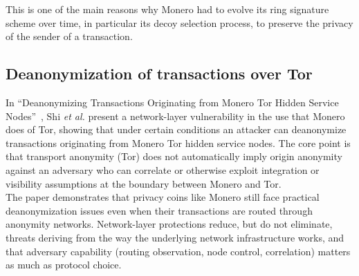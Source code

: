 \documentclass[conference]{IEEEtran}
\begin{document}
This is one of the main reasons why Monero had to evolve its ring signature scheme over time, in particular its decoy selection process, to preserve the privacy of the sender of a transaction.

\subsection{Deanonymization of transactions over Tor}
In ``Deanonymizing Transactions Originating from Monero Tor Hidden Service Nodes''~\cite{monero_tor_deanonymization}, Shi \emph{et al.} present a network-layer vulnerability in the use that Monero does of Tor, showing that under certain conditions an attacker can deanonymize transactions originating from Monero Tor hidden service nodes. The core point is that transport anonymity (Tor) does not automatically imply origin anonymity against an adversary who can correlate or otherwise exploit integration or visibility assumptions at the boundary between Monero and Tor.\\

The paper demonstrates that privacy coins like Monero still face practical deanonymization issues even when their transactions are routed through anonymity networks. Network-layer protections reduce, but do not eliminate, threats deriving from the way the underlying network infrastructure works, and that adversary capability (routing observation, node control, correlation) matters as much as protocol choice.
\end{document}
